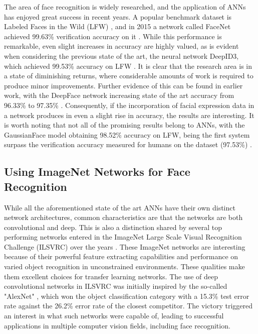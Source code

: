 The area of face recognition is widely researched, and the application of ANNs has enjoyed great success in recent years. A popular benchmark dataset is Labeled Faces in the Wild (LFW) \cite{lfw}, and in 2015 a network called FaceNet achieved 99.63\% verification accuracy on it \cite{facenet}. While this performance is remarkable, even slight increases in accuracy are highly valued, as is evident when considering the previous state of the art, the neural network DeepID3, which achieved 99.53\% accuracy on LFW \cite{deepid3}. It is clear that the research area is in a state of diminishing returns, where considerable amounts of work is required to produce minor improvements. Further evidence of this can be found in earlier work, with the DeepFace network increasing state of the art accuracy from 96.33\% to 97.35\% \cite{deepface}. Consequently, if the incorporation of facial expression data in a network produces in even a slight rise in accuracy, the results are interesting. It is worth noting that not all of the promising results belong to ANNs, with the GaussianFace model obtaining 98.52\% accuracy on LFW, being the first system surpass the verification accuracy measured for humans on the dataset (97.53\%) \cite{gaussianface}.

\subsection{Using ImageNet Networks for Face Recognition}

While all the aforementioned state of the art ANNs have their own distinct network architectures, common characteristics are that the networks are both convolutional and deep. This is also a distinction shared by several top performing networks entered in the ImageNet Large Scale Visual Recognition Challenge (ILSVRC) \cite{imagenet} over the years \cite{inception, vgg, googlenet}. These ImageNet networks are interesting because of their powerful feature extracting capabilities and performance on varied object recognition in unconstrained environments. These qualities make them excellent choices for transfer learning networks. The use of deep convolutional networks in ILSVRC was initially inspired by the so-called "AlexNet" \cite{alexnet}, which won the object classification category with a 15.3\% test error rate against the 26.2\% error rate of the closest competitor. The victory triggered an interest in what such networks were capable of, leading to successful applications in multiple computer vision fields, including face recognition. \\

